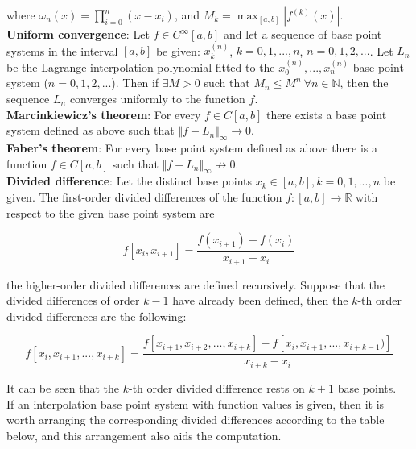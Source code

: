 \documentclass[margin=0px]{article}
\begin{document}
\noindent where $\omega_{n}(x) = \displaystyle\prod_{i=0}^{n}(x-x_{i})$, and $M_{k} = \displaystyle\max_{[a,b]}|f^{(k)}(x)|$.\\

\noindent \textbf{Uniform convergence}: Let $f \in C^{\infty}[a,b]$ and let a sequence of base point systems in the interval $[a,b]$
be given: $x_{k}^{(n)}$, $k=0,1,...,n$, $n=0,1,2,...$. Let $L_{n}$ be the Lagrange interpolation polynomial fitted to the
$x_{0}^{(n)}, ... ,x_{n}^{(n)}$ base point system ($n=0,1,2,...$). Then if $\exists M>0$ such that
$M_{n} \leq M^{n} \ \forall n \in \mathbb{N}$, then the sequence $L_{n}$ converges uniformly to the function $f$.\\

\noindent \textbf{Marcinkiewicz's theorem}: For every $f \in C[a,b]$ there exists a base point system defined as above
such that $\Vert f - L_{n}\Vert_{\infty} \to 0$.\\

\noindent \textbf{Faber's theorem}: For every base point system defined as above there is a function $f \in C[a,b]$
such that $\Vert f - L_{n}\Vert_{\infty} \not \to 0$.\\

\noindent \textbf{Divided difference}: Let the distinct base points $x_{k} \in [a,b], k=0,1,...,n$ be given.
The first-order divided differences of the function $f:[a,b] \to \mathbb{R}$ with respect to the given base point system are

\begin{displaymath}
    f[x_{i},x_{i+1}] = \frac{f(x_{i+1})-f(x_{i})}{x_{i+1} - x_{i}}
\end{displaymath}

\noindent the higher-order divided differences are defined recursively. Suppose that the divided differences of order $k-1$
have already been defined, then the $k$-th order divided differences are the following:

\begin{displaymath}
    f[x_{i},x_{i+1},...,x_{i+k}] = \frac{f[x_{i+1},x_{i+2}, ..., x_{i+k}]-f[x_{i},x_{i+1}, ..., x_{i+k-1})]}{x_{i+k} - x_{i}}
\end{displaymath}

\noindent It can be seen that the $k$-th order divided difference rests on $k+1$ base points.\\

If an interpolation base point system with function values is given, then it is worth arranging the corresponding divided differences according to the
table below, and this arrangement also aids the computation.
\end{document}
